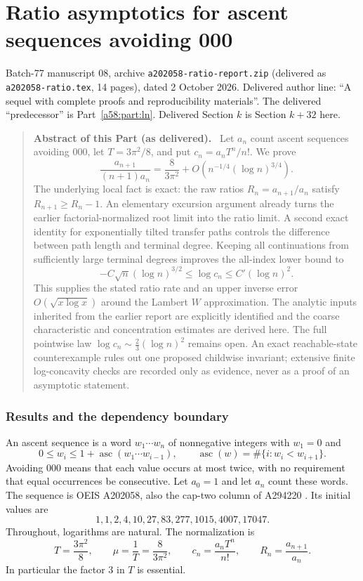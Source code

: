 \documentclass[11pt,letterpaper]{article}
\newcommand{\file}[1]{\nolinkurl{#1}}
\theoremstyle{remark}
\newcommand{\asc}{\operatorname{asc}}
\newenvironment{partabstract}{\begin{quote}\small\noindent\textbf{Abstract of this Part (as delivered).}\ }{\end{quote}}
\newcommand{\partsource}[1]{\par\noindent\begin{minipage}{\textwidth}\small #1\end{minipage}\par\medskip}
\begin{document}
\part{Ratio asymptotics for ascent sequences avoiding 000}\label{a58:part:rt}
\partsource{Batch-77 manuscript 08, archive \file{a202058-ratio-report.zip} (delivered as \file{a202058-ratio.tex}, 14 pages), dated 2 October 2026. Delivered author line: ``A sequel with complete proofs and reproducibility materials''. The delivered ``predecessor'' is Part~\ref{a58:part:ln}. Delivered Section $k$ is Section $k+32$ here.}
\begin{partabstract}
Let $a_n$ count ascent sequences avoiding $000$, let $T=3\pi^2/8$, and
put $c_n=a_nT^n/n!$. We prove
\[
 \frac{a_{n+1}}{(n+1)a_n}=\frac8{3\pi^2}
   +O\!\left(n^{-1/4}(\log n)^{3/4}\right).
\]
The underlying local fact is exact: the raw ratios $R_n=a_{n+1}/a_n$
satisfy $R_{n+1}\ge R_n-1$. An elementary excursion argument already
turns the earlier factorial-normalized root limit into the ratio limit.
A second exact identity for exponentially tilted transfer paths controls
the difference between path length and terminal degree. Keeping all
continuations from sufficiently large terminal degrees improves the
all-index lower bound to
\[
 -C\sqrt n(\log n)^{3/2}\le\log c_n\le C'(\log n)^2.
\]
This supplies the stated ratio rate and an upper inverse error
$O(\sqrt{x\log x})$ around the Lambert $W$ approximation. The analytic
inputs inherited from the earlier report are explicitly identified and
the coarse characteristic and concentration estimates are derived here.
The full pointwise law $\log c_n\sim\tfrac23(\log n)^2$ remains open.
An exact reachable-state counterexample rules out one proposed childwise
invariant; extensive finite log-concavity checks are recorded only as
evidence, never as a proof of an asymptotic statement.
\end{partabstract}

\section{Results and the dependency boundary}
An ascent sequence is a word $w_1\cdots w_n$ of nonnegative integers with
$w_1=0$ and
\[
 0\le w_i\le1+\asc(w_1\cdots w_{i-1}),\qquad
 \asc(w)=\#\{i:w_i<w_{i+1}\}.
\]
Avoiding $000$ means that each value occurs at most twice, with no
requirement that equal occurrences be consecutive. Let $a_0=1$ and
let $a_n$ count these words. The sequence is OEIS A202058, also the
cap-two column of A294220 \cite{OEIS,OEIStriangle}. Its initial values are
\[
 1,1,2,4,10,27,83,277,1015,4007,17047.
\]
Throughout, logarithms are natural. The normalization is
\begin{equation}\label{a58:rt:eq:normalization}
 T=\frac{3\pi^2}{8},\qquad \mu=\frac1T=\frac8{3\pi^2},\qquad
 c_n=\frac{a_nT^n}{n!},\qquad R_n=\frac{a_{n+1}}{a_n}.
\end{equation}
In particular the factor $3$ in $T$ is essential.
\end{document}

